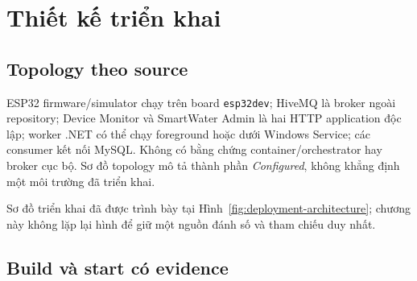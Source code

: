 \chapter{Thiết kế triển khai}
\label{chap:deployment}

\section{Topology theo source}

ESP32 firmware/simulator chạy trên board \texttt{esp32dev}; HiveMQ là broker ngoài
repository; Device Monitor và SmartWater Admin là hai HTTP application độc lập; worker
.NET có thể chạy foreground hoặc dưới Windows Service; các consumer kết nối MySQL.
Không có bằng chứng container/orchestrator hay broker cục bộ. Sơ đồ topology mô tả
thành phần \textit{Configured}, không khẳng định một môi trường đã triển khai.

Sơ đồ triển khai đã được trình bày tại Hình~\ref{fig:deployment-architecture}; chương này
không lặp lại hình để giữ một nguồn đánh số và tham chiếu duy nhất.

\section{Build và start có evidence}

